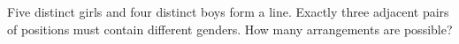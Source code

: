 Five distinct girls and four distinct boys form a line. Exactly three adjacent pairs of positions must contain different genders. How many arrangements are possible?
